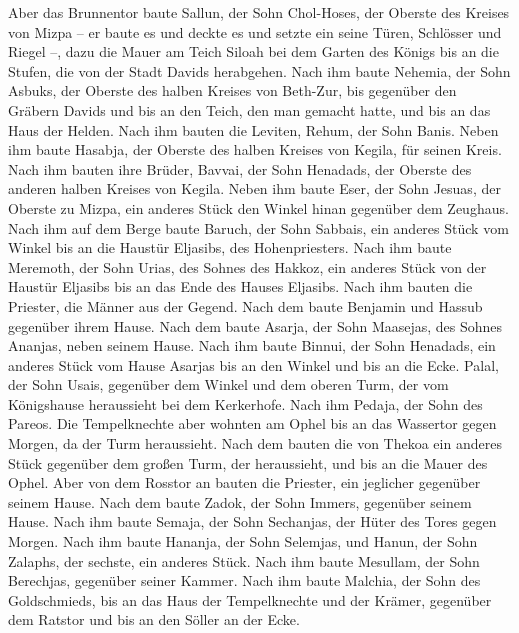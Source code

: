  Aber das Brunnentor baute Sallun, der Sohn Chol-Hoses,
der Oberste des Kreises von Mizpa -- er baute es und deckte es und
setzte ein seine Türen, Schlösser und Riegel --, dazu die Mauer am Teich
Siloah bei dem Garten des Königs bis an die Stufen, die von der Stadt
Davids herabgehen.  Nach ihm baute Nehemia, der Sohn
Asbuks, der Oberste des halben Kreises von Beth-Zur, bis gegenüber den
Gräbern Davids und bis an den Teich, den man gemacht hatte, und bis an
das Haus der Helden.  Nach ihm bauten die Leviten, Rehum,
der Sohn Banis. Neben ihm baute Hasabja, der Oberste des halben Kreises
von Kegila, für seinen Kreis.  Nach ihm bauten ihre
Brüder, Bavvai, der Sohn Henadads, der Oberste des anderen halben
Kreises von Kegila.  Neben ihm baute Eser, der Sohn
Jesuas, der Oberste zu Mizpa, ein anderes Stück den Winkel hinan
gegenüber dem Zeughaus.  Nach ihm auf dem Berge baute
Baruch, der Sohn Sabbais, ein anderes Stück vom Winkel bis an die
Haustür Eljasibs, des Hohenpriesters.  Nach ihm baute
Meremoth, der Sohn Urias, des Sohnes des Hakkoz, ein anderes Stück von
der Haustür Eljasibs bis an das Ende des Hauses Eljasibs.
 Nach ihm bauten die Priester, die Männer aus der Gegend.
 Nach dem baute Benjamin und Hassub gegenüber ihrem
Hause. Nach dem baute Asarja, der Sohn Maasejas, des Sohnes Ananjas,
neben seinem Hause.  Nach ihm baute Binnui, der Sohn
Henadads, ein anderes Stück vom Hause Asarjas bis an den Winkel und bis
an die Ecke.  Palal, der Sohn Usais, gegenüber dem Winkel
und dem oberen Turm, der vom Königshause heraussieht bei dem Kerkerhofe.
Nach ihm Pedaja, der Sohn des Pareos.  Die Tempelknechte
aber wohnten am Ophel bis an das Wassertor gegen Morgen, da der Turm
heraussieht.  Nach dem bauten die von Thekoa ein anderes
Stück gegenüber dem großen Turm, der heraussieht, und bis an die Mauer
des Ophel.  Aber von dem Rosstor an bauten die Priester,
ein jeglicher gegenüber seinem Hause.  Nach dem baute
Zadok, der Sohn Immers, gegenüber seinem Hause. Nach ihm baute Semaja,
der Sohn Sechanjas, der Hüter des Tores gegen Morgen. 
Nach ihm baute Hananja, der Sohn Selemjas, und Hanun, der Sohn Zalaphs,
der sechste, ein anderes Stück. Nach ihm baute Mesullam, der Sohn
Berechjas, gegenüber seiner Kammer.  Nach ihm baute
Malchia, der Sohn des Goldschmieds, bis an das Haus der Tempelknechte
und der Krämer, gegenüber dem Ratstor und bis an den Söller an der Ecke.
